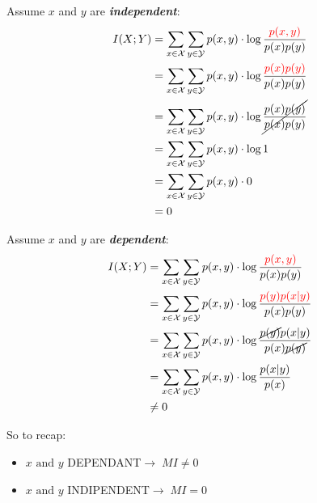 \begin{center}
    \begin{minipage}[t]{0.4\textwidth}
        \noindent
        Assume $x$ and $y$ are \textit{\textbf{independent}}:
        \begin{equation}
            \begin{split}
                I(X;Y)&=\sum_{x\in\mathcal{X}}\sum_{y\in\mathcal{Y}}p(x,y)\cdot\log{\frac{\textcolor{red}{p(x,y)}}{p(x)p(y)}}\\
                &=\sum_{x\in\mathcal{X}}\sum_{y\in\mathcal{Y}}p(x,y)\cdot\log{\frac{\textcolor{red}{p(x)p(y)}}{p(x)p(y)}}\\
                &=\sum_{x\in\mathcal{X}}\sum_{y\in\mathcal{Y}}p(x,y)\cdot\log{\cancel{\frac{p(x)p(y)}{p(x)p(y)}}}\\
                &=\sum_{x\in\mathcal{X}}\sum_{y\in\mathcal{Y}}p(x,y)\cdot\log{1}\\
                &=\sum_{x\in\mathcal{X}}\sum_{y\in\mathcal{Y}}p(x,y)\cdot0\\
                &=0
            \end{split}
        \end{equation}
    \end{minipage}
    \begin{minipage}[t]{0.4\textwidth}
        \noindent
        Assume $x$ and $y$ are \textit{\textbf{dependent}}:
        \begin{equation}
            \begin{split}
                I(X;Y)&=\sum_{x\in\mathcal{X}}\sum_{y\in\mathcal{Y}}p(x,y)\cdot\log{\frac{\textcolor{red}{p(x,y)}}{p(x)p(y)}}\\
                &=\sum_{x\in\mathcal{X}}\sum_{y\in\mathcal{Y}}p(x,y)\cdot\log{\frac{\textcolor{red}{p(y)p(x|y)}}{p(x)p(y)}}\\
                &=\sum_{x\in\mathcal{X}}\sum_{y\in\mathcal{Y}}p(x,y)\cdot\log{\frac{\cancel{p(y)}p(x|y)}{p(x)\cancel{p(y)}}}\\
                &=\sum_{x\in\mathcal{X}}\sum_{y\in\mathcal{Y}}p(x,y)\cdot\log{\frac{p(x|y)}{p(x)}}\\
                &\ne 0
            \end{split}
        \end{equation}
    \end{minipage}
\end{center}
\newpage
So to recap:
\begin{itemize}
    \item $x \text{ and } y$ DEPENDANT$\rightarrow\;MI\ne 0$
    \item $x \text{ and } y$ INDIPENDENT$\rightarrow\;MI=0$
\end{itemize}
